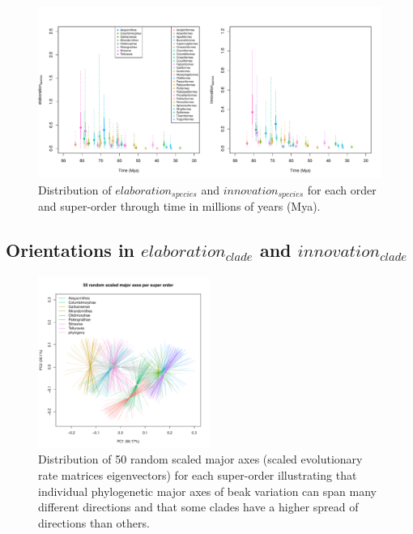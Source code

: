 \documentclass[12pt,a4paper]{article}
\begin{document}
\begin{figure}[H]
\centering
   \includegraphics[width=1\textwidth]{Figures/Elaboration_and_innovation_species_through_time.pdf}
\caption{Distribution of $elaboration_{species}$ and $innovation_{species}$ for each order and super-order through time in millions of years (Mya).}
\label{Fig:figure_ei_species_through_time}
\end{figure}

\newpage

\subsection{Orientations in $elaboration_{clade}$ and $innovation_{clade}$}

\begin{figure}[H]
\centering
   \includegraphics[width=0.5\textwidth]{Figures/50_random_axes_superorders.pdf}
\caption{Distribution of 50 random scaled major axes (scaled evolutionary rate matrices eigenvectors) for each super-order illustrating that individual phylogenetic major axes of beak variation can span many different directions and that some clades have a higher spread of directions than others.}
\label{Fig:mikado}
\end{figure}
\end{document}
